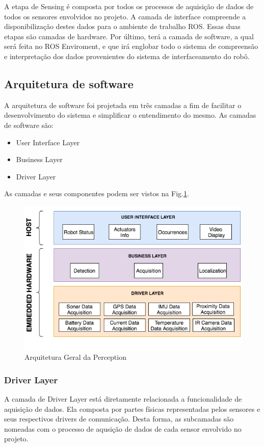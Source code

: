  A etapa de Sensing é composta por todos os processos de aquisição de dados de todos os sensores envolvidos no projeto. A camada de interface compreende a disponibilização destes dados para o ambiente de trabalho ROS. Essas duas etapas são camadas de hardware. Por último, terá a camada de software, a qual será feita no ROS Enviroment, e que irá englobar todo o sistema de compreensão e interpretação dos dados provenientes do sistema de interfaceamento do robô.
 
\subsection{Arquitetura de software}

A arquitetura de software foi projetada em três camadas a fim de facilitar o desenvolvimento do sistema e simplificar o entendimento do mesmo. As camadas de software são:

\begin{itemize}
\item User Interface Layer
\item Business Layer
\item Driver Layer
\end{itemize} 
As camadas e seus componentes podem ser vistos na Fig.\ref{arqsoft}.
\begin{figure}[H]
\centering
\includegraphics[width=15cm]{Figures/ArquiteturadeSoftware.png}
\caption{Arquitetura Geral da Perception}\label{arqsoft}
\end{figure}

\subsubsection{Driver Layer}
A camada de Driver Layer está diretamente relacionada a funcionalidade de aquisição de dados. Ela composta por partes físicas representadas pelos sensores e seus respectivos drivers de comunicação. Desta forma, as subcamadas são nomeadas com o processo de aqusição de dados de cada sensor envolvido no projeto.

